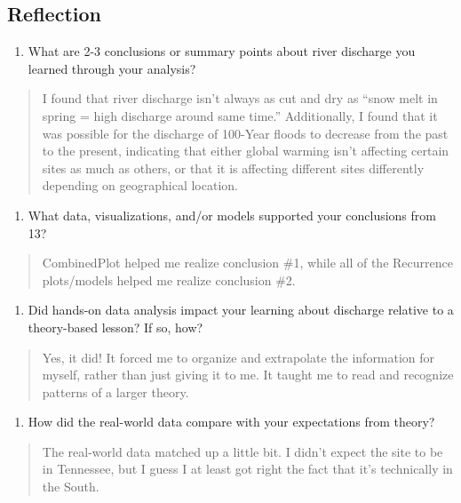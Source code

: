 \documentclass[]{article}
\providecommand{\tightlist}{%
  \setlength{\itemsep}{0pt}\setlength{\parskip}{0pt}}
\begin{document}
\hypertarget{reflection}{%
\subsection{Reflection}\label{reflection}}

\begin{enumerate}
\def\labelenumi{\arabic{enumi}.}
\setcounter{enumi}{12}
\tightlist
\item
  What are 2-3 conclusions or summary points about river discharge you
  learned through your analysis?
\end{enumerate}

\begin{quote}
I found that river discharge isn't always as cut and dry as ``snow melt
in spring = high discharge around same time.'' Additionally, I found
that it was possible for the discharge of 100-Year floods to decrease
from the past to the present, indicating that either global warming
isn't affecting certain sites as much as others, or that it is affecting
different sites differently depending on geographical location.
\end{quote}

\begin{enumerate}
\def\labelenumi{\arabic{enumi}.}
\setcounter{enumi}{13}
\tightlist
\item
  What data, visualizations, and/or models supported your conclusions
  from 13?
\end{enumerate}

\begin{quote}
CombinedPlot helped me realize conclusion \#1, while all of the
Recurrence plots/models helped me realize conclusion \#2.
\end{quote}

\begin{enumerate}
\def\labelenumi{\arabic{enumi}.}
\setcounter{enumi}{14}
\tightlist
\item
  Did hands-on data analysis impact your learning about discharge
  relative to a theory-based lesson? If so, how?
\end{enumerate}

\begin{quote}
Yes, it did! It forced me to organize and extrapolate the information
for myself, rather than just giving it to me. It taught me to read and
recognize patterns of a larger theory.
\end{quote}

\begin{enumerate}
\def\labelenumi{\arabic{enumi}.}
\setcounter{enumi}{15}
\tightlist
\item
  How did the real-world data compare with your expectations from
  theory?
\end{enumerate}

\begin{quote}
The real-world data matched up a little bit. I didn't expect the site to
be in Tennessee, but I guess I at least got right the fact that it's
technically in the South.
\end{quote}
\end{document}
